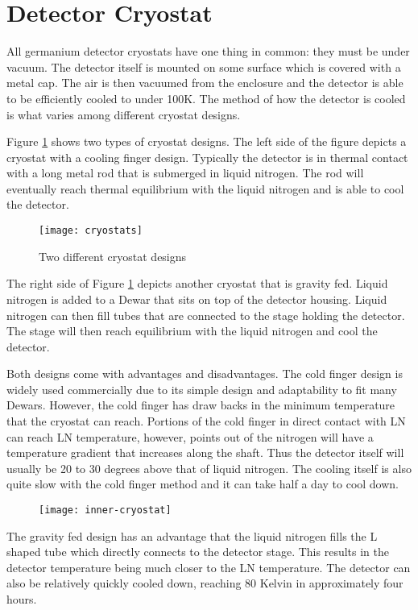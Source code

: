 \section{Detector Cryostat}
All germanium detector cryostats have one thing in common: they must be under vacuum.
The detector itself is mounted on some surface which is covered with a metal cap.
The air is then vacuumed from the enclosure and the detector is able to be efficiently cooled to under 100K.
The method of how the detector is cooled is what varies among different cryostat designs.

Figure \ref{fig:cryostats} shows two types of cryostat designs.
The left side of the figure depicts a cryostat with a cooling finger design.
Typically the detector is in thermal contact with a long metal rod that is submerged in liquid nitrogen.
The rod will eventually reach thermal equilibrium with the liquid nitrogen and is able to cool the detector.
\begin{figure}[htpb]
\centering
\texttt{[image: cryostats]}
\caption{Two different cryostat designs}
\label{fig:cryostats}
\end{figure}
The right side of Figure \ref{fig:cryostats} depicts another cryostat that is gravity fed.
Liquid nitrogen is added to a Dewar that sits on top of the detector housing.
Liquid nitrogen can then fill tubes that are connected to the stage holding the detector.
The stage will then reach equilibrium with the liquid nitrogen and cool the detector.

Both designs come with advantages and disadvantages.
The cold finger design is widely used commercially due to its simple design and adaptability to fit many Dewars.
However, the cold finger has draw backs in the minimum temperature that the cryostat can reach.
Portions of the cold finger in direct contact with LN can reach LN temperature, however, points out of the nitrogen will have a temperature gradient that increases along the shaft.
Thus the detector itself will usually be 20 to 30 degrees above that of liquid nitrogen.
The cooling itself is also quite slow with the cold finger method and it can take half a day to cool down.
\begin{figure}[htpb]
\centering
\texttt{[image: inner-cryostat]}
\caption{}
\label{fig:inner-cryostat}
\end{figure}
The gravity fed design has an advantage that the liquid nitrogen fills the L shaped tube which directly connects to the detector stage.
This results in the detector temperature being much closer to the LN temperature.
The detector can also be relatively quickly cooled down, reaching 80 Kelvin in approximately four hours.

